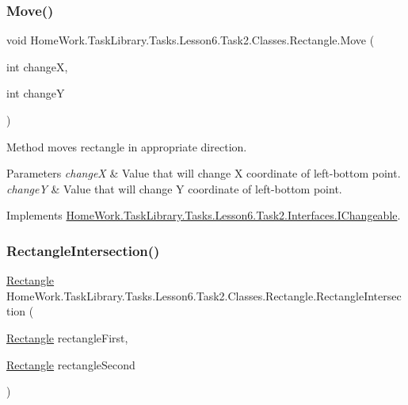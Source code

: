 \subsubsection{\texorpdfstring{Move()}{Move()}}
{\footnotesize\ttfamily void Home\+Work.\+Task\+Library.\+Tasks.\+Lesson6.\+Task2.\+Classes.\+Rectangle.\+Move (\begin{DoxyParamCaption}\item[{int}]{changeX,  }\item[{int}]{changeY }\end{DoxyParamCaption})}



Method moves rectangle in appropriate direction. 


\begin{DoxyParams}{Parameters}
{\em changeX} & Value that will change X coordinate of left-\/bottom point.\\
\hline
{\em changeY} & Value that will change Y coordinate of left-\/bottom point.\\
\hline
\end{DoxyParams}


Implements \mbox{\hyperlink{interface_home_work_1_1_task_library_1_1_tasks_1_1_lesson6_1_1_task2_1_1_interfaces_1_1_i_changeable_a86e3712a90bdc833d17cff47cdfd7923}{Home\+Work.\+Task\+Library.\+Tasks.\+Lesson6.\+Task2.\+Interfaces.\+I\+Changeable}}.

\mbox{\label{class_home_work_1_1_task_library_1_1_tasks_1_1_lesson6_1_1_task2_1_1_classes_1_1_rectangle_a1055ff34695887cce20d98e2d1838407}} 
\subsubsection{\texorpdfstring{RectangleIntersection()}{RectangleIntersection()}}
{\footnotesize\ttfamily \mbox{\hyperlink{class_home_work_1_1_task_library_1_1_tasks_1_1_lesson6_1_1_task2_1_1_classes_1_1_rectangle}{Rectangle}} Home\+Work.\+Task\+Library.\+Tasks.\+Lesson6.\+Task2.\+Classes.\+Rectangle.\+Rectangle\+Intersection (\begin{DoxyParamCaption}\item[{\mbox{\hyperlink{class_home_work_1_1_task_library_1_1_tasks_1_1_lesson6_1_1_task2_1_1_classes_1_1_rectangle}{Rectangle}}}]{rectangle\+First,  }\item[{\mbox{\hyperlink{class_home_work_1_1_task_library_1_1_tasks_1_1_lesson6_1_1_task2_1_1_classes_1_1_rectangle}{Rectangle}}}]{rectangle\+Second }\end{DoxyParamCaption})}



